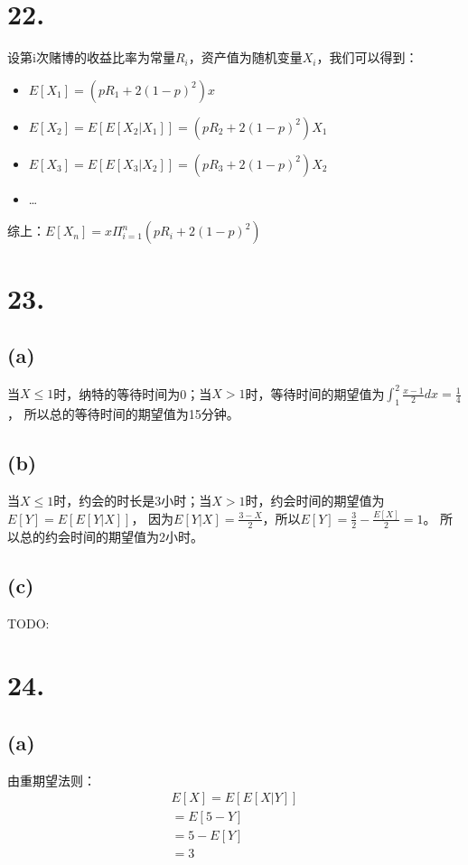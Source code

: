 \documentclass[UTF8]{report}
\begin{document}
    \section*{22.} 
        设第i次赌博的收益比率为常量$R_i$，资产值为随机变量$X_i$，我们可以得到：
        \begin{itemize}
            \item $E[X_1] = (pR_1 + 2(1 - p)^2)x$
            \item $E[X_2] = E[E[X_2|X_1]] = (pR_2 + 2(1 - p)^2)X_1$
            \item $E[X_3] = E[E[X_3|X_2]] = (pR_3 + 2(1 - p)^2)X_2$
            \item \dots
        \end{itemize}

        综上：$E[X_n] = x\Pi_{i = 1}^n(pR_i + 2(1 - p)^2)$
    \section*{23.}
        \subsection*{(a)}
            当$X \leq 1$时，纳特的等待时间为0；当$X > 1$时，等待时间的期望值为$\int_{1}^{2}\frac{x - 1}{2}dx = \frac{1}{4}$，
            所以总的等待时间的期望值为15分钟。
        \subsection*{(b)}
            当$X \leq 1$时，约会的时长是3小时；当$X > 1$时，约会时间的期望值为$E[Y] = E[E[Y|X]]$，
            因为$E[Y|X] = \frac{3 - X}{2}$，所以$E[Y] = \frac{3}{2} - \frac{E[X]}{2} = 1$。
            所以总的约会时间的期望值为2小时。
        \subsection*{(c)}
            TODO:
    \section*{24.}
        \subsection*{(a)}
            由重期望法则：
            $$\begin{array}{l}
                E[X] = E[E[X|Y]] \\
                = E[5 - Y] \\
                = 5 - E[Y] \\
                = 3
            \end{array}$$
\end{document}
